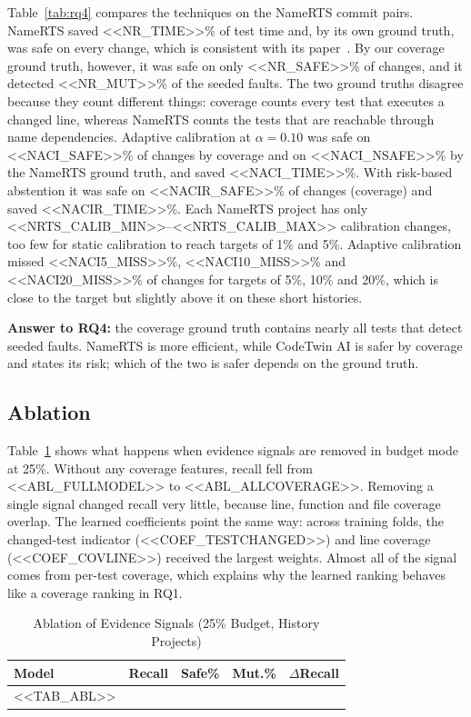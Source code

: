 \documentclass[conference]{IEEEtran}
\begin{document}
Table~\ref{tab:rq4} compares the techniques on the NameRTS commit pairs. NameRTS saved <<NR_TIME>>\% of test time and, by its own ground truth, was safe on every change, which is consistent with its paper~\cite{wang2026namerts}. By our coverage ground truth, however, it was safe on only <<NR_SAFE>>\% of changes, and it detected <<NR_MUT>>\% of the seeded faults. The two ground truths disagree because they count different things: coverage counts every test that executes a changed line, whereas NameRTS counts the tests that are reachable through name dependencies. Adaptive calibration at $\alpha=0.10$ was safe on <<NACI_SAFE>>\% of changes by coverage and on <<NACI_NSAFE>>\% by the NameRTS ground truth, and saved <<NACI_TIME>>\%. With risk-based abstention it was safe on <<NACIR_SAFE>>\% of changes (coverage) and saved <<NACIR_TIME>>\%. Each NameRTS project has only <<NRTS_CALIB_MIN>>--<<NRTS_CALIB_MAX>> calibration changes, too few for static calibration to reach targets of 1\% and 5\%. Adaptive calibration missed <<NACI5_MISS>>\%, <<NACI10_MISS>>\% and <<NACI20_MISS>>\% of changes for targets of 5\%, 10\% and 20\%, which is close to the target but slightly above it on these short histories.

\textbf{Answer to RQ4:} the coverage ground truth contains nearly all tests that detect seeded faults. NameRTS is more efficient, while CodeTwin AI is safer by coverage and states its risk; which of the two is safer depends on the ground truth.

\subsection{Ablation}\label{sec:ablation}
Table~\ref{tab:ablation} shows what happens when evidence signals are removed in budget mode at 25\%. Without any coverage features, recall fell from <<ABL_FULLMODEL>> to <<ABL_ALLCOVERAGE>>. Removing a single signal changed recall very little, because line, function and file coverage overlap. The learned coefficients point the same way: across training folds, the changed-test indicator (<<COEF_TESTCHANGED>>) and line coverage (<<COEF_COVLINE>>) received the largest weights. Almost all of the signal comes from per-test coverage, which explains why the learned ranking behaves like a coverage ranking in RQ1.

\begin{table}[t]
\caption{Ablation of Evidence Signals (25\% Budget, History Projects)}
\label{tab:ablation}
\centering
\footnotesize
\begin{tabular}{@{}lrrrr@{}}
\toprule
\textbf{Model} & \textbf{Recall} & \textbf{Safe\%} & \textbf{Mut.\%} & \textbf{$\Delta$Recall} \\
\midrule
<<TAB_ABL>>
\bottomrule
\end{tabular}
\end{table}
\end{document}
